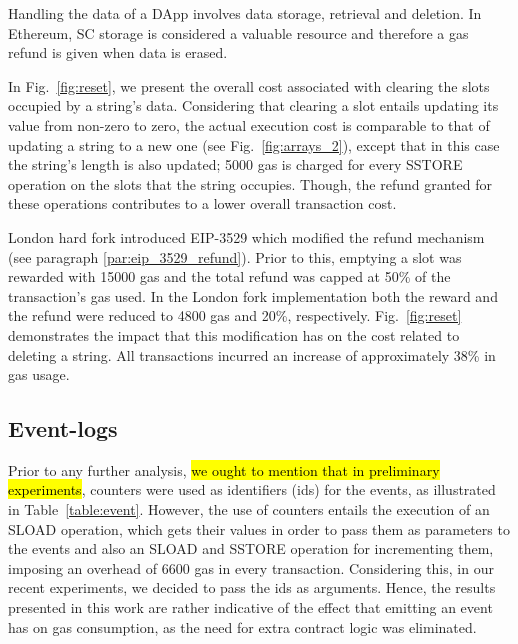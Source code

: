 Handling the data of a DApp involves data storage, retrieval and deletion. In Ethereum, SC storage is considered a valuable resource and therefore a gas refund is given when data is erased.

In Fig.~\ref{fig:reset}, we present the overall cost associated with clearing the slots occupied by a string’s data. Considering that clearing a slot entails updating its value from non-zero to zero, the actual execution cost is comparable to that of updating a string to a new one (see Fig.~\ref{fig:arrays_2}), except that in this case the string's length is also updated; 5000 gas is charged for every SSTORE operation on the slots that the string occupies. Though, the refund granted for these operations contributes to a lower overall transaction cost.

London hard fork introduced EIP-3529  \citep{buterin_eip_3529} which modified the refund mechanism (see paragraph \ref{par:eip_3529_refund}). Prior to this, emptying a slot was rewarded with 15000 gas and the total refund was capped at 50\% of the transaction’s gas used. In the London fork implementation both the reward and the refund were reduced to 4800 gas and 20\%, respectively. Fig.~\ref{fig:reset} demonstrates the impact that this modification has on the cost related to deleting a string. All transactions incurred an increase of approximately 38\% in gas usage.

\subsection{Event-logs}\label{subsection:evaluation_logs}

Prior to any further analysis, \hl{we ought to mention that in preliminary experiments}, counters were used as identifiers (ids) for the events, as illustrated in Table~\ref{table:event}. However, the use of counters entails the execution of an SLOAD operation, which gets their values in order to pass them as parameters to the events and also an SLOAD and SSTORE operation for incrementing them, imposing an overhead of 6600 gas in every transaction. Considering this, in our recent experiments, we decided to pass the ids as arguments. Hence, the results presented in this work are rather indicative of the effect that emitting an event has on gas consumption, as the need for extra contract logic was eliminated.


